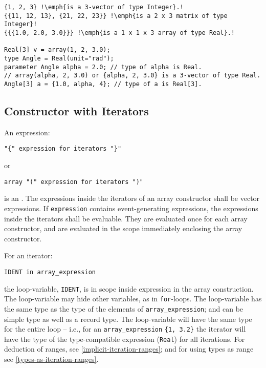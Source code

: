 \begin{example}
\begin{lstlisting}[language=modelica, escapechar=!]
{1, 2, 3} !\emph{is a 3-vector of type Integer}.!
{{11, 12, 13}, {21, 22, 23}} !\emph{is a 2 x 3 matrix of type Integer}!
{{{1.0, 2.0, 3.0}}} !\emph{is a 1 x 1 x 3 array of type Real}.!

Real[3] v = array(1, 2, 3.0);
type Angle = Real(unit="rad");
parameter Angle alpha = 2.0; // type of alpha is Real.
// array(alpha, 2, 3.0) or {alpha, 2, 3.0} is a 3-vector of type Real.
Angle[3] a = {1.0, alpha, 4}; // type of a is Real[3].
\end{lstlisting}
\end{example}

\subsection{Constructor with Iterators}\label{array-constructor-with-iterators}\label{constructor-with-iterators}

An expression:
\begin{lstlisting}[language=grammar]
"{" expression for iterators "}"
\end{lstlisting}
or
\begin{lstlisting}[language=grammar]
array "(" expression for iterators ")"
\end{lstlisting}
is an .
The expressions inside the iterators of an array constructor shall be vector expressions.
If \lstinline!expression! contains event-generating expressions, the expressions inside the iterators shall be evaluable.
They are evaluated once for each array constructor, and are evaluated in the scope immediately enclosing the array constructor.

For an iterator:
\begin{lstlisting}[language=modelica]
IDENT in array_expression
\end{lstlisting}
the loop-variable, \lstinline!IDENT!, is in scope inside expression in the array construction.
The loop-variable may hide other variables, as in \lstinline!for!-loops.
The loop-variable has the same type as
the type of the elements of \lstinline!array_expression!; and can be simple type as well as a record type.
The loop-variable will have the same type for the entire loop -- i.e., for an
\lstinline!array_expression! \lstinline!{1, 3.2}! the iterator will have the type of the type-compatible expression (\lstinline!Real!) for all iterations.
For deduction of ranges, see
\cref{implicit-iteration-ranges}; and for using types as range see \cref{types-as-iteration-ranges}.

